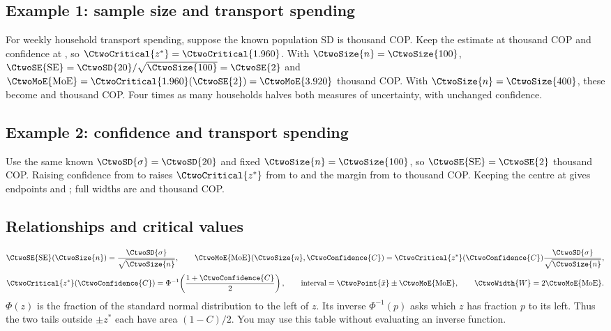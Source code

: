 \subsection{Example 1: sample size and transport spending}\label{subsec:c3-transport-example}
For weekly household transport spending, suppose the known population SD is  thousand COP. Keep the estimate at  thousand COP and confidence at , so $\CtwoCritical{z^*}=\CtwoCritical{1.960}$.
With $\CtwoSize{n}=\CtwoSize{100}$, $\CtwoSE{\mathrm{SE}}=\CtwoSD{20}/\sqrt{\CtwoSize{100}}=\CtwoSE{2}$ and $\CtwoMoE{\mathrm{MoE}}=\CtwoCritical{1.960}(\CtwoSE{2})=\CtwoMoE{3.920}$ thousand COP.
With $\CtwoSize{n}=\CtwoSize{400}$, these become  and  thousand COP. Four times as many households halves both measures of uncertainty, with unchanged confidence.

\subsection{Example 2: confidence and transport spending}\label{subsec:c3-quick-check}
Use the same known $\CtwoSD{\sigma}=\CtwoSD{20}$ and fixed $\CtwoSize{n}=\CtwoSize{100}$, so $\CtwoSE{\mathrm{SE}}=\CtwoSE{2}$ thousand COP. Raising confidence from  to  raises $\CtwoCritical{z^*}$ from  to  and the margin from  to  thousand COP. Keeping the centre at  gives endpoints  and ; full widths are  and  thousand COP.

\subsection*{Relationships and critical values}
\begin{gather*}
\CtwoSE{\mathrm{SE}}(\CtwoSize{n})=\frac{\CtwoSD{\sigma}}{\sqrt{\CtwoSize{n}}},\qquad
\CtwoMoE{\mathrm{MoE}}(\CtwoSize{n},\CtwoConfidence{C})=
\CtwoCritical{z^*}(\CtwoConfidence{C})\frac{\CtwoSD{\sigma}}{\sqrt{\CtwoSize{n}}},\\[3pt]
\CtwoCritical{z^*}(\CtwoConfidence{C})=\Phi^{-1}\!\left(\frac{1+\CtwoConfidence{C}}{2}\right),\qquad
\text{interval}=\CtwoPoint{\bar{x}}\pm\CtwoMoE{\mathrm{MoE}},\qquad
\CtwoWidth{W}=2\CtwoMoE{\mathrm{MoE}}.
\end{gather*}
$\Phi(z)$ is the fraction of the standard normal distribution to the left of $z$. Its inverse $\Phi^{-1}(p)$ asks which $z$ has fraction $p$ to its left. Thus the two tails outside $\pm z^*$ each have area $(1-C)/2$. You may use this table without evaluating an inverse function.


